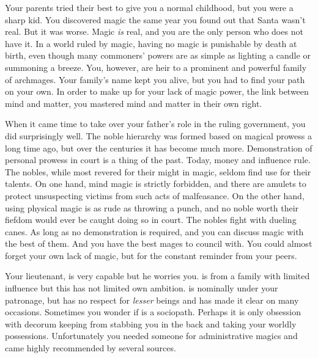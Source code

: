 \documentclass[char]{guildcamp3}
\begin{document}
\name{\cNobleOne{}}





Your parents tried their best to give you a normal childhood, but you were a sharp kid. You discovered magic the same year you found out that Santa wasn't real. But it was worse. Magic \emph{is} real, and you are the only person who does not have it. In a world ruled by magic, having no magic is punishable by death at birth, even though many commoners' powers are as simple as lighting a candle or summoning a breeze. You, however, are heir to a prominent and powerful family of archmages. Your family's name kept you alive, but you had to find your path on your own. In order to make up for your lack of magic power, the link between mind and matter, you mastered mind and matter in their own right.

When it came time to take over your father's role in the ruling government, you did surprisingly well. The noble hierarchy was formed based on magical prowess a long time ago, but over the centuries it has become much more. Demonstration of personal prowess in court is a thing of the past. Today, money and influence rule. The nobles, while most revered for their might in magic, seldom find use for their talents. On one hand, mind magic is strictly forbidden, and there are amulets to protect unsuspecting victims from such acts of malfeasance. On the other hand, using physical magic is as rude as throwing a punch, and no noble worth their fiefdom would ever be caught doing so in court. The nobles fight with dueling canes. As long as no demonstration is required, and you can discuss magic with the best of them. And you have the best mages to council with. You could almost forget your own lack of magic, but for the constant reminder from your peers.

Your lieutenant, \cNobleTwo{\intro} is very capable but he worries you.  is from a family with limited influence but this has not limited  own ambition. \cNobleTwo{} is nominally under your patronage, but  has no respect for \emph{lesser} beings and has made it clear on many occasions. Sometimes you wonder if \cNobleTwo{} is a sociopath. Perhaps it is only  obsession with decorum keeping \cNobleTwo{\them} from stabbing you in the back and taking your worldly possessions. Unfortunately you needed someone for administrative magics and \cNobleTwo{} came highly recommended by several sources. 
\end{document}
